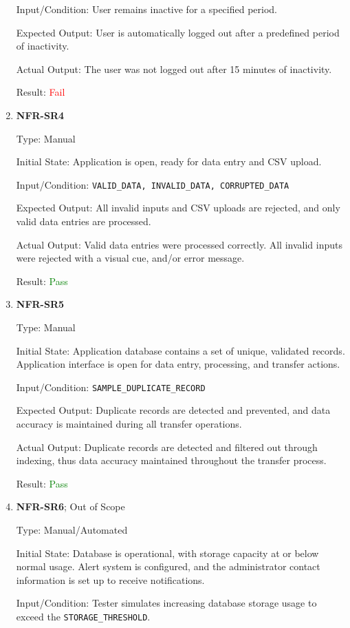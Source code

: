 \documentclass[12pt, titlepage]{article}
\begin{document}
\begin{enumerate}
Input/Condition: User remains inactive for a specified period.

Expected Output: User is automatically logged out after a predefined period of
inactivity.

Actual Output: The user was not logged out after 15 minutes of inactivity.

Result: \textcolor{red}{Fail}
\item{\textbf{NFR-SR4}} \label{NFR:SR4}

Type: Manual

Initial State: Application is open, ready for data entry and CSV upload.

Input/Condition: \texttt{VALID\_DATA, INVALID\_DATA, CORRUPTED\_DATA}

Expected Output: All invalid inputs and CSV uploads are rejected, and only valid
data entries are processed.

Actual Output: Valid data entries were processed correctly. All invalid inputs
were rejected with a visual cue, and/or error message.

Result: \textcolor{green}{Pass}

  \item{\textbf{NFR-SR5}} \label{NFR:SR5}

Type: Manual

Initial State: Application database contains a set of unique, validated records.
Application interface is open for data entry, processing, and transfer actions.

Input/Condition: \texttt{SAMPLE\_DUPLICATE\_RECORD}

Expected Output: Duplicate records are detected and prevented, and data accuracy
is maintained during all transfer operations.

Actual Output: Duplicate records are detected and filtered out through indexing, thus data accuracy maintained
throughout the transfer process.

Result: \textcolor{green}{Pass}

\item{\textbf{NFR-SR6}}; Out of Scope \label{NFR:SR6}

Type: Manual/Automated

Initial State: Database is operational, with storage capacity at or below normal
usage. Alert system is configured, and the administrator contact information is
set up to receive notifications. 

Input/Condition: Tester simulates increasing database storage usage to exceed
the \texttt{STORAGE\_THRESHOLD}.


\end{enumerate}
\end{document}
